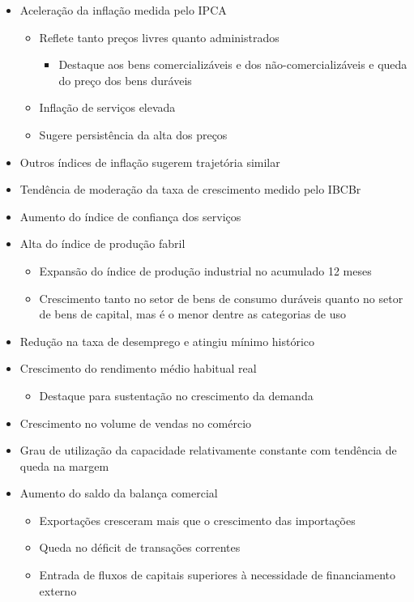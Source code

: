 \documentclass[11pt]{article}
\begin{document}
\begin{itemize}
\item Aceleração da inflação medida pelo IPCA
\begin{itemize}
\item Reflete tanto preços livres quanto administrados
\begin{itemize}
\item Destaque aos bens comercializáveis e dos não-comercializáveis e queda do preço dos bens duráveis
\end{itemize}
\item Inflação de serviços elevada
\item Sugere persistência da alta dos preços
\end{itemize}
\item Outros índices de inflação sugerem trajetória similar
\item Tendência de moderação da taxa de crescimento medido pelo IBCBr
\item Aumento do índice de confiança dos serviços
\item Alta do índice de produção fabril
\begin{itemize}
\item Expansão do índice de produção industrial no acumulado 12 meses
\item Crescimento tanto no setor de bens de consumo duráveis quanto no setor de bens de capital, mas é o menor dentre as categorias de uso
\end{itemize}
\item Redução na taxa de desemprego e atingiu mínimo histórico
\item Crescimento do rendimento médio habitual real
\begin{itemize}
\item Destaque para sustentação no crescimento da demanda
\end{itemize}
\item Crescimento no volume de vendas no comércio
\item Grau de utilização da capacidade relativamente constante com tendência de queda na margem
\item Aumento do saldo da balança comercial
\begin{itemize}
\item Exportações cresceram mais que o crescimento das importações
\item Queda no déficit de transações correntes
\item Entrada de fluxos de capitais superiores à necessidade de financiamento externo

\end{itemize}
\end{itemize}
\end{document}
